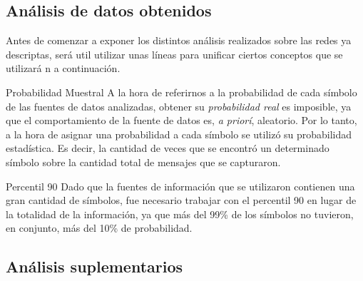 \subsection{An\'alisis de datos obtenidos}
    \par Antes de comenzar a exponer los distintos an\'alisis realizados sobre las redes
    ya descriptas, ser\'a util utilizar unas l\'ineas para unificar ciertos conceptos que
    se utilizar\'a n a continuaci\'on.

    \begin{LaTeXdescription}
        \item[Probabilidad Muestral] A la hora de referirnos a la probabilidad de cada
        s\'imbolo de las fuentes de datos analizadas, obtener su \textit{probabilidad
        real} es imposible, ya que el comportamiento de la fuente de datos es, \textit{%
        a prior\'i}, aleatorio. Por lo tanto, a la hora de asignar una probabilidad a cada
        s\'imbolo se utiliz\'o su probabilidad estad\'istica. Es decir, la cantidad de
        veces que se encontr\'o un determinado s\'imbolo sobre la cantidad total de mensajes
        que se capturaron.\\

        \item[Percentil 90] Dado que la fuentes de informaci\'on que se utilizaron contienen
        una gran cantidad de s\'imbolos, fue necesario trabajar con el percentil 90 en lugar
        de la totalidad de la informaci\'on, ya que m\'as del 99\% de los s\'imbolos no
        tuvieron, en conjunto, m\'as del 10\% de probabilidad.\\

    \end{LaTeXdescription}


    

    

    

    


\subsection{An\'alisis suplementarios}\label{sec:escenario1_supl}
    


\FloatBarrier
